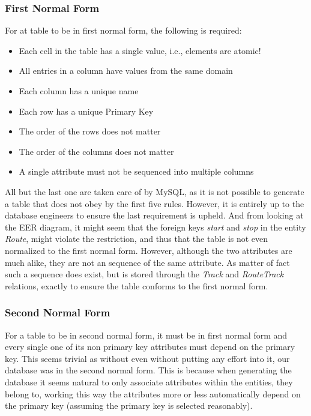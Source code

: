 \subsubsection{First Normal Form}
For at table to be in first normal form, the following is required:
\begin{itemize}
    \item Each cell in the table has a single value, i.e., elements are atomic!
    \item All entries in a column have values from the same domain
    \item Each column has a unique name
    \item Each row has a unique Primary Key
    \item The order of the rows does not matter
    \item The order of the columns does not matter
    \item A single attribute must not be sequenced into multiple columns
\end{itemize}
All but the last one are taken care of by MySQL, as it is not possible to 
generate a table that does not obey by the first five rules. However, it is 
entirely up to the database engineers to ensure the last requirement is upheld. 
And from looking at the EER diagram, it might seem that the foreign keys 
\emph{start} and \emph{stop} in the entity \emph{Route}, might violate the 
restriction, and thus that the table is not even normalized to the first normal 
form. However, although the two attributes are much alike, they are not an 
sequence of the same attribute. As matter of fact such a sequence does exist, 
but is stored through the \emph{Track} and \emph{RouteTrack} relations, exactly 
to ensure the table conforms to the first normal form. 

\subsubsection{Second Normal Form}
For a table to be in second normal form, it must be in first normal form and 
every single one of its non primary key attributes must depend on the primary 
key. This seems trivial as without even without putting any effort into it, our 
database was in the second normal form. This is because when generating the 
database it seems natural to only associate attributes within the entities, 
they belong to, working this way the attributes more or less automatically 
depend on the primary key (assuming the primary key is selected reasonably). 

